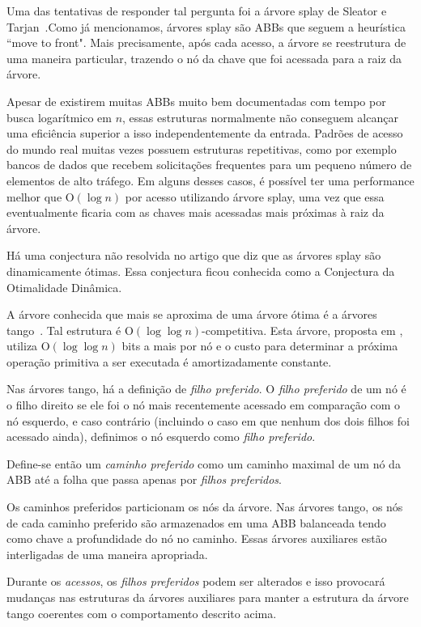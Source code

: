 Uma das tentativas de responder tal pergunta foi a árvore splay de Sleator e Tarjan~\cite{selfadjustingbst}.Como já mencionamos, árvores splay são ABBs que seguem a heurística ``move to front". Mais precisamente, após cada acesso, a árvore se reestrutura de uma maneira particular, trazendo o nó da chave que foi acessada para a raiz da árvore.

Apesar de existirem muitas ABBs muito bem documentadas com tempo por busca logarítmico em $n$, essas estruturas normalmente não conseguem alcançar uma eficiência superior a isso independentemente da entrada. Padrões de acesso do mundo real muitas vezes possuem estruturas repetitivas, como por exemplo bancos de dados que recebem solicitações frequentes para um pequeno número de elementos de alto tráfego. Em alguns desses casos, é possível ter uma performance melhor que O$(\log n)$ por acesso utilizando árvore splay, uma vez que essa eventualmente ficaria com as chaves mais acessadas mais próximas à raiz da árvore. 

Há uma conjectura não resolvida no artigo \cite{selfadjustingbst} que diz que as árvores splay são dinamicamente ótimas. Essa conjectura ficou conhecida como a Conjectura da Otimalidade Dinâmica.

A árvore conhecida que mais se aproxima de uma árvore ótima é a árvores tango~\cite{dynamicoptimality}. Tal estrutura é O$(\log \log n)$-competitiva. Esta árvore, proposta em \cite{dynamicoptimality}, utiliza O$(\log \log n)$ bits a mais por nó e o custo para determinar a próxima operação primitiva a ser executada é amortizadamente constante.

Nas árvores tango, há a definição de \textit{filho preferido}. O \textit{filho preferido} de um nó é o filho direito se ele foi o nó mais recentemente acessado em comparação com o nó esquerdo, e caso contrário (incluindo o caso em que nenhum dos dois filhos foi acessado ainda), definimos o nó esquerdo como \textit{filho preferido}.

Define-se então um \textit{caminho preferido} como um caminho maximal de um nó da ABB até a folha que passa apenas por \textit{filhos preferidos}. 

Os caminhos preferidos particionam os nós da árvore. Nas árvores tango, os nós de cada caminho preferido são armazenados em uma ABB balanceada tendo como chave a profundidade do nó no caminho. Essas árvores auxiliares estão interligadas de uma maneira apropriada.

Durante os \textit{acessos}, os \textit{filhos preferidos} podem ser alterados e isso provocará mudanças nas estruturas da árvores auxiliares para manter a estrutura da árvore tango coerentes com o comportamento descrito acima.

